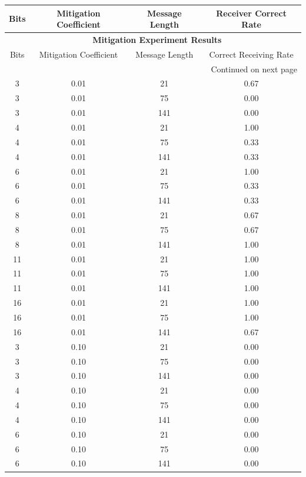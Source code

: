 \documentclass[10pt,a4paper]{article}
\begin{document}
\begin{center}
\begin{longtable}{cccc}
\toprule
Bits & Mitigation Coefficient & Message Length & Receiver Correct Rate \\
\midrule
\endfirsthead

\multicolumn{4}{c}{{\bfseries \tablename\ \thetable{} Mitigation Experiment Results}} \\
\toprule
Bits & Mitigation Coefficient & Message Length & Correct Receiving Rate \\
\midrule
\endhead

\midrule \multicolumn{4}{r}{{Continued on next page}} \\
\endfoot

\bottomrule
\endlastfoot

3  & 0.01 & 21  & 0.67 \\
3  & 0.01 & 75  & 0.00 \\
3  & 0.01 & 141 & 0.00 \\
4  & 0.01 & 21  & 1.00 \\
4  & 0.01 & 75  & 0.33 \\
4  & 0.01 & 141 & 0.33 \\
6  & 0.01 & 21  & 1.00 \\
6  & 0.01 & 75  & 0.33 \\
6  & 0.01 & 141 & 0.33 \\
8  & 0.01 & 21  & 0.67 \\
8  & 0.01 & 75  & 0.67 \\
8  & 0.01 & 141 & 1.00 \\
11 & 0.01 & 21  & 1.00 \\
11 & 0.01 & 75  & 1.00 \\
11 & 0.01 & 141 & 1.00 \\
16 & 0.01 & 21  & 1.00 \\
16 & 0.01 & 75  & 1.00 \\
16 & 0.01 & 141 & 0.67 \\
3  & 0.10 & 21  & 0.00 \\
3  & 0.10 & 75  & 0.00 \\
3  & 0.10 & 141 & 0.00 \\
4  & 0.10 & 21  & 0.00 \\
4  & 0.10 & 75  & 0.00 \\
4  & 0.10 & 141 & 0.00 \\
6  & 0.10 & 21  & 0.00 \\
6  & 0.10 & 75  & 0.00 \\
6  & 0.10 & 141 & 0.00 \\

\end{longtable}
\end{center}
\end{document}
